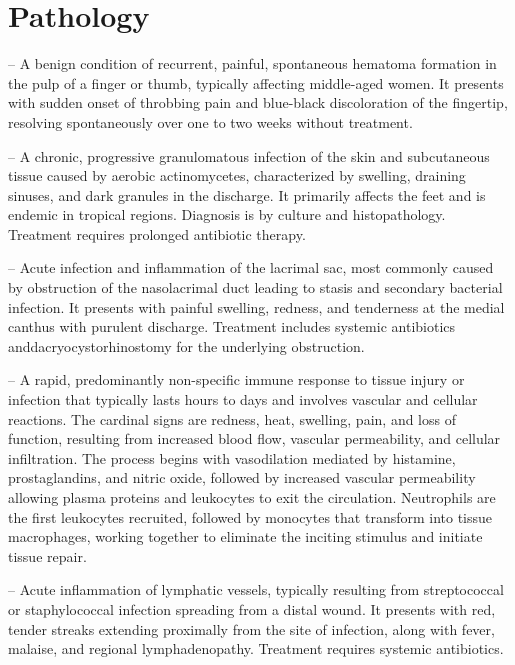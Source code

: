 \chapter{Pathology}

-- A benign condition of recurrent, painful, spontaneous hematoma formation in the pulp of a finger or thumb, typically affecting middle-aged women. It presents with sudden onset of throbbing pain and blue-black discoloration of the fingertip, resolving spontaneously over one to two weeks without treatment.

-- A chronic, progressive granulomatous infection of the skin and subcutaneous tissue caused by aerobic actinomycetes, characterized by swelling, draining sinuses, and dark granules in the discharge. It primarily affects the feet and is endemic in tropical regions. Diagnosis is by culture and histopathology. Treatment requires prolonged antibiotic therapy.

-- Acute infection and inflammation of the lacrimal sac, most commonly caused by obstruction of the nasolacrimal duct leading to stasis and secondary bacterial infection. It presents with painful swelling, redness, and tenderness at the medial canthus with purulent discharge. Treatment includes systemic antibiotics anddacryocystorhinostomy for the underlying obstruction.

-- A rapid, predominantly non-specific immune response to tissue injury or infection that typically lasts hours to days and involves vascular and cellular reactions. The cardinal signs are redness, heat, swelling, pain, and loss of function, resulting from increased blood flow, vascular permeability, and cellular infiltration. The process begins with vasodilation mediated by histamine, prostaglandins, and nitric oxide, followed by increased vascular permeability allowing plasma proteins and leukocytes to exit the circulation. Neutrophils are the first leukocytes recruited, followed by monocytes that transform into tissue macrophages, working together to eliminate the inciting stimulus and initiate tissue repair.

-- Acute inflammation of lymphatic vessels, typically resulting from streptococcal or staphylococcal infection spreading from a distal wound. It presents with red, tender streaks extending proximally from the site of infection, along with fever, malaise, and regional lymphadenopathy. Treatment requires systemic antibiotics.

